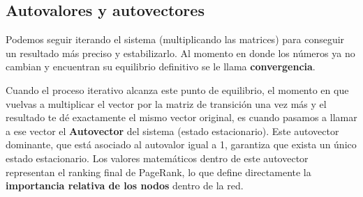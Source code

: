 \subsection{Autovalores y autovectores}
Podemos seguir iterando el sistema (multiplicando las matrices) para conseguir un resultado más preciso y estabilizarlo. Al momento en donde los números ya no cambian y encuentran su equilibrio definitivo se le llama \textbf{convergencia}.

Cuando el proceso iterativo alcanza este punto de equilibrio, el momento en que vuelvas a multiplicar el vector por la matriz de transición una vez más y el resultado te dé exactamente el mismo vector original, es cuando pasamos a llamar a ese vector el \textbf{Autovector} del sistema (estado estacionario). Este autovector dominante, que está asociado al autovalor igual a 1, garantiza que exista un único estado estacionario. Los valores matemáticos dentro de este autovector representan el ranking final de PageRank, lo que define directamente la \textbf{importancia relativa de los nodos} dentro de la red.
